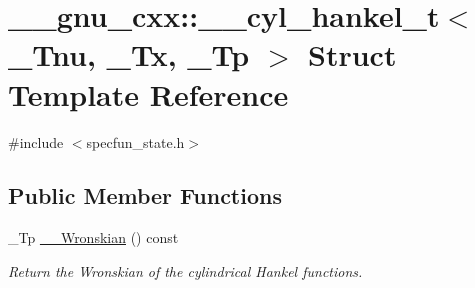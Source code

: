 \hypertarget{struct____gnu__cxx_1_1____cyl__hankel__t}{}\section{\+\_\+\+\_\+gnu\+\_\+cxx\+:\+:\+\_\+\+\_\+cyl\+\_\+hankel\+\_\+t$<$ \+\_\+\+Tnu, \+\_\+\+Tx, \+\_\+\+Tp $>$ Struct Template Reference}
\label{struct____gnu__cxx_1_1____cyl__hankel__t}


{\ttfamily \#include $<$specfun\+\_\+state.\+h$>$}

\subsection*{Public Member Functions}
\begin{DoxyCompactItemize}
\item 
\+\_\+\+Tp \hyperlink{struct____gnu__cxx_1_1____cyl__hankel__t_a876ab84732e90aeb91200873783f9bb6}{\+\_\+\+\_\+\+Wronskian} () const 
\begin{DoxyCompactList}\small\item\em Return the Wronskian of the cylindrical Hankel functions. \end{DoxyCompactList}\end{DoxyCompactItemize}

